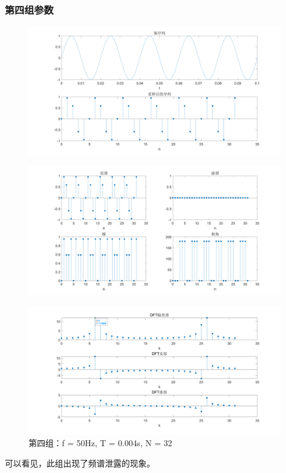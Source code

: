 \documentclass{../source/Experiment copy}
\begin{document}
\subsubsection{第四组参数}
\begin{figure}[H]
    \centering
    \includegraphics[width = \textwidth]{src/exp2_4_1.png}
\end{figure}

\begin{figure}[H]
    \centering
    \includegraphics[width = \textwidth]{src/exp2_4_2.png}
\end{figure}

\begin{figure}[H]
    \centering
    \includegraphics[width = \textwidth]{src/exp2_4_3.png}
    \caption{第四组：f = 50Hz, T = 0.004s, N = 32}
\end{figure}
可以看见，此组出现了频谱泄露的现象。
\end{document}
